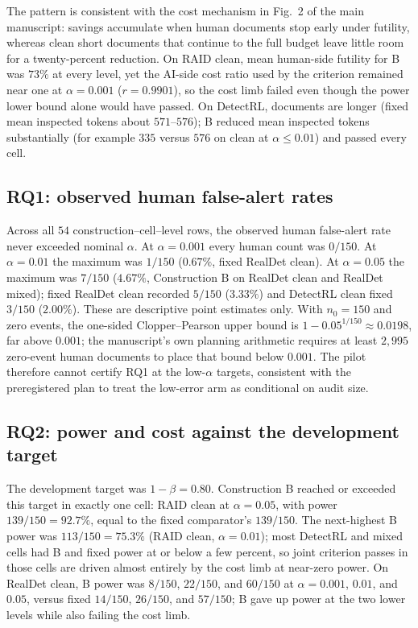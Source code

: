 \documentclass[pdflatex,sn-mathphys-num]{sn-jnl}
\begin{document}
The pattern is consistent with the cost mechanism in Fig.~2 of the main manuscript: savings accumulate when human documents stop early under futility, whereas clean short documents that continue to the full budget leave little room for a twenty-percent reduction. On RAID clean, mean human-side futility for B was \(73\%\) at every level, yet the AI-side cost ratio used by the criterion remained near one at \(\alpha=0.001\) (\(r=0.9901\)), so the cost limb failed even though the power lower bound alone would have passed. On DetectRL, documents are longer (fixed mean inspected tokens about \(571\)--\(576\)); B reduced mean inspected tokens substantially (for example \(335\) versus \(576\) on clean at \(\alpha\le 0.01\)) and passed every cell.

\subsection{RQ1: observed human false-alert rates}

Across all \(54\) construction--cell--level rows, the observed human false-alert rate never exceeded nominal \(\alpha\). At \(\alpha=0.001\) every human count was \(0/150\). At \(\alpha=0.01\) the maximum was \(1/150\) (\(0.67\%\), fixed RealDet clean). At \(\alpha=0.05\) the maximum was \(7/150\) (\(4.67\%\), Construction B on RealDet clean and RealDet mixed); fixed RealDet clean recorded \(5/150\) (\(3.33\%\)) and DetectRL clean fixed \(3/150\) (\(2.00\%\)). These are descriptive point estimates only. With \(n_0=150\) and zero events, the one-sided Clopper--Pearson upper bound is \(1-0.05^{1/150}\approx 0.0198\), far above \(0.001\); the manuscript's own planning arithmetic requires at least \(2{,}995\) zero-event human documents to place that bound below \(0.001\). The pilot therefore cannot certify RQ1 at the low-\(\alpha\) targets, consistent with the preregistered plan to treat the low-error arm as conditional on audit size.

\subsection{RQ2: power and cost against the development target}

The development target was \(1-\beta=0.80\). Construction B reached or exceeded this target in exactly one cell: RAID clean at \(\alpha=0.05\), with power \(139/150=92.7\%\), equal to the fixed comparator's \(139/150\). The next-highest B power was \(113/150=75.3\%\) (RAID clean, \(\alpha=0.01\)); most DetectRL and mixed cells had B and fixed power at or below a few percent, so joint criterion passes in those cells are driven almost entirely by the cost limb at near-zero power. On RealDet clean, B power was \(8/150\), \(22/150\), and \(60/150\) at \(\alpha=0.001\), \(0.01\), and \(0.05\), versus fixed \(14/150\), \(26/150\), and \(57/150\); B gave up power at the two lower levels while also failing the cost limb.
\end{document}
